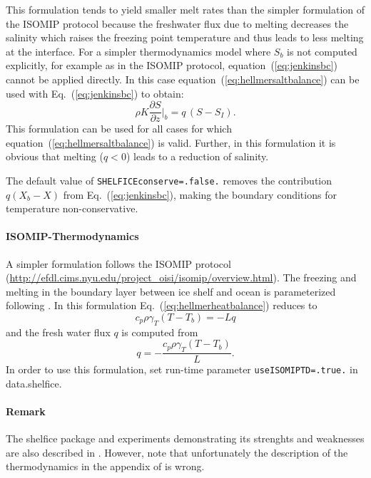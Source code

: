 This formulation tends to yield smaller melt rates than the simpler
formulation of the ISOMIP protocol because the freshwater flux due to
melting decreases the salinity which raises the freezing point
temperature and thus leads to less melting at the interface. For a
simpler thermodynamics model where $S_b$ is not computed explicitly,
for example as in the ISOMIP protocol, equation~(\ref{eq:jenkinsbc}) cannot
be applied directly. In this case equation~(\ref{eq:hellmersaltbalance})
can be used with Eq.~(\ref{eq:jenkinsbc}) to obtain:
\begin{equation}
 \rho{K}\frac{\partial{S}}{\partial{z}}\biggl|_{b}  = q\,(S-S_I).
\end{equation}
This formulation can be used for all cases for which
equation~(\ref{eq:hellmersaltbalance}) is valid. Further, in this
formulation it is obvious that melting ($q<0$) leads to a reduction of
salinity.

The default value of \texttt{SHELFICEconserve=.false.} removes the
contribution $q ( X_{b}-X )$ from Eq.~(\ref{eq:jenkinsbc}), making the
boundary conditions for temperature non-conservative.

\paragraph{ISOMIP-Thermodynamics}
\label{sec:pkg:shelfice:isomip}

A simpler formulation follows the ISOMIP protocol
(\url{http://efdl.cims.nyu.edu/project_oisi/isomip/overview.html}). The
freezing and melting in the boundary layer between ice shelf and ocean
is parameterized following \citet{grosfeld97}. In this formulation
Eq.~(\ref{eq:hellmerheatbalance}) reduces to 
\begin{equation}
  \label{eq:isomipheatbalance}
  c_{p} \rho \gamma_T (T - T_{b})  = -Lq 
\end{equation}
and the fresh water flux $q$ is computed from
\begin{equation}
  \label{eq:isomipfwflx}
  q = - \frac{c_{p} \rho \gamma_T (T - T_{b})}{L}.
\end{equation}
In order to use this formulation, set run-time parameter
\texttt{useISOMIPTD=.true.} in data.shelfice.

\paragraph{Remark} The shelfice package and experiments demonstrating
its strenghts and weaknesses are also described in
\citet{losch08}. However, note that unfortunately the description of
the thermodynamics in the appendix of \citet{losch08} is wrong.


